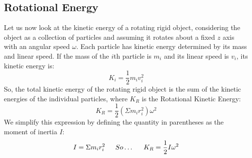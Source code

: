 \documentclass{article}
\begin{document}
	\subsection{Rotational Energy}
    	Let us now look at the kinetic energy of a rotating rigid object, considering the object as a collection of particles and assuming it rotates about a fixed $z$ axis with an angular speed $\omega$. Each particle has kinetic energy determined by its mass and linear speed. If the mass of the $i$th particle is $m_i$ and its linear speed is $v_i$, its kinetic energy is:
        \[
        	K_i=\frac{1}{2}m_iv_i^2
        \]
        So, the total kinetic energy of the rotating rigid object is the sum of the kinetic energies of the individual particles, where $K_R$ is the Rotational Kinetic Energy:
        \[
        	K_R=\frac{1}{2}(\Sigma m_ir_i^2)\omega^2
        \]
        We simplify this expression by defining the quantity in parentheses as the moment of inertia $I$:
        \[
        	I=\Sigma m_ir_i^2 \indent
            So\ldots\indent
            K_R=\frac{1}{2}I\omega^2
        \]
        
\end{document}
